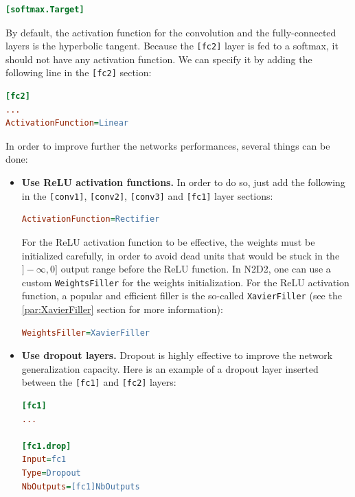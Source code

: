 \documentclass[a4paper,11pt,oneside]{article}
\newenvironment{myitemize}
{ \begin{itemize}
    \setlength{\itemsep}{0pt}
    \setlength{\parskip}{0pt}
    \setlength{\parsep}{0pt}     }
{ \end{itemize}                  }
\begin{document}
\begin{lstlisting}[language=ini]
[softmax.Target]
\end{lstlisting}

By default, the activation function for the convolution and the fully-connected
layers is the hyperbolic tangent. Because the \lstinline![fc2]! layer is fed
to a softmax, it should not have any activation function. We can specify it by
adding the following line in the \lstinline![fc2]! section:

\begin{lstlisting}[language=ini]
[fc2]
...
ActivationFunction=Linear
\end{lstlisting}

In order to improve further the networks performances, several things can be
done:

\begin{myitemize}
\item \textbf{Use ReLU activation functions.}
In order to do so, just add the following
in the \lstinline![conv1]!,  \lstinline![conv2]!, \lstinline![conv3]! and
\lstinline![fc1]! layer sections:

\begin{lstlisting}[language=ini]
ActivationFunction=Rectifier
\end{lstlisting}

For the ReLU activation function to be effective, the weights must be
initialized carefully, in order to avoid dead units that would be stuck in the
$]-\infty,0]$ output range before the ReLU function. In N2D2, one can use a
custom \lstinline!WeightsFiller! for the weights initialization. For the ReLU
activation function, a popular and efficient filler is the so-called
\lstinline!XavierFiller! (see the \ref{par:XavierFiller} section for more
information):

\begin{lstlisting}[language=ini]
WeightsFiller=XavierFiller
\end{lstlisting}

\item \textbf{Use dropout layers.}
Dropout is highly effective to improve the network
generalization capacity. Here is an example of a dropout layer inserted between
the \lstinline![fc1]! and \lstinline![fc2]! layers:

\begin{lstlisting}[language=ini]
[fc1]
...

[fc1.drop]
Input=fc1
Type=Dropout
NbOutputs=[fc1]NbOutputs


\end{lstlisting}
\end{myitemize}
\end{document}
